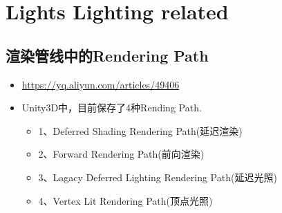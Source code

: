 \documentclass[9pt, b5paper]{article}
\begin{document}
\section{Lights Lighting related}
\label{sec:org6c0c8d2}
\subsection{渲染管线中的Rendering Path}
\label{sec:org5347c8e}
\begin{itemize}
\item \url{https://yq.aliyun.com/articles/49406}
\item Unity3D中，目前保存了4种Rending Path.
\begin{itemize}
\item 1、Deferred Shading Rendering Path(延迟渲染)
\item 2、Forward Rendering Path(前向渲染)
\item 3、Lagacy Deferred Lighting Rendering Path(延迟光照)
\item 4、Vertex Lit Rendering Path(顶点光照)
\end{itemize}
\end{itemize}
\end{document}
